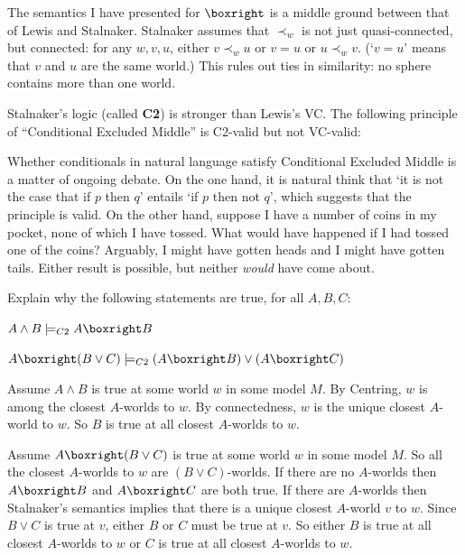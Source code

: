 
The semantics I have presented for $\boxright$ is a middle ground between that
of Lewis and Stalnaker. Stalnaker assumes that $\prec_w$ is not just
quasi-connected, but connected: for any $w,v,u$, either $v \prec_w u$ or $v=u$
or $u \prec_w v$. (`$v=u$' means that $v$ and $u$ are the same world.) This
rules out ties in similarity: no sphere contains more than one world.

Stalnaker's logic (called \textbf{C2}) is stronger than Lewis's VC. The
following principle of ``Conditional Excluded Middle'' is C2-valid but not VC-valid:
%


Whether conditionals in natural language satisfy Conditional Excluded Middle is
a matter of ongoing debate. On the one hand, it is natural think that `it is not
the case that if $p$ then $q$' entails `if $p$ then not $q$', which suggests
that the principle is valid. On the other hand, suppose I have a number of coins
in my pocket, none of which I have tossed. What would have happened if I had
tossed one of the coins? Arguably, I might have gotten heads and I might have
gotten tails. Either result is possible, but neither \emph{would} have come
about.

\begin{exercise}
  Explain why the following statements are true, for all $A,B,C$:
  \begin{exlist}
  \item $A \land B \models_{C2} A \boxright B$
  \item $A \boxright (B\lor C) \models_{C2} (A \boxright B) \lor (A \boxright C)$
  \end{exlist}
\end{exercise}
\begin{solution}
  \begin{sollist}
    \item Assume $A\land B$ is true at some world $w$ in some model $M$. By
    Centring, $w$ is among the closest $A$-worlds to $w$. By connectedness, $w$
    is the unique closest $A$-world to $w$. So $B$ is true at all closest
    $A$-worlds to $w$.
    \item Assume $A \boxright (B\lor C)$ is true at some world $w$ in some model
    $M$. So all the closest $A$-worlds to $w$ are $(B\lor C)$-worlds. If there
    are no $A$-worlds then $A \boxright B$ and $A \boxright C$ are both true. If
    there are $A$-worlds then Stalnaker's semantics implies that there is a
    unique closest $A$-world $v$ to $w$. Since $B\lor C$ is true at $v$, either $B$ or $C$ must be true at $v$. So either $B$ is true at all closest $A$-worlds to $w$ or $C$ is true at all closest $A$-worlds to $w$.
  \end{sollist}
\end{solution}

